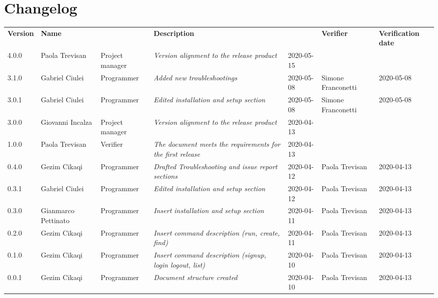 \section*{Changelog}
\renewcommand{\arraystretch}{1.8}
  \setlength\LTleft{-1.7cm}
  \begin{longtable}{|p{1.7cm}|p{2cm}|p{2.5cm}|p{3cm}|p{1.7cm}|p{2cm}|p{2.3cm}|}
    \hline
    \rowcolor{header}
    \textbf{Version} & \textbf{Name} & \centering{\textbf{Role}} & \textbf{Description} &      \centering{\textbf{Date}} & \textbf{Verifier} & \textbf{Verification date} \\
    4.0.0 & Paola Trevisan & Project manager & \small{\textit{Version alignment to the release product}} & 2020-05-15 & & \\
    
    3.1.0 & Gabriel Ciulei  & Programmer & \small{\textit{Added new troubleshootings}} & 2020-05-08 & Simone Franconetti & 2020-05-08 \\
    
    3.0.1 & Gabriel Ciulei  & Programmer & \small{\textit{Edited installation and setup section}} & 2020-05-08 & Simone Franconetti & 2020-05-08 \\
    
    3.0.0 & Giovanni Incalza & Project manager & \small{\textit{Version alignment to the release product}} & 2020-04-13 & & \\
    
    1.0.0 & Paola Trevisan & Verifier & \small{\textit{The document meets the requirements for the first release}} & 2020-04-13 & & \\
    
    0.4.0 & Gezim Cikaqi & Programmer & \small{\textit{Drafted Troubleshooting and issue report sections}} & 2020-04-12 & Paola Trevisan & 2020-04-13 \\
    
    0.3.1 & Gabriel Ciulei  & Programmer & \small{\textit{Edited installation and setup section}} & 2020-04-12 & Paola Trevisan & 2020-04-13 \\
    
    0.3.0 & Gianmarco Pettinato  & Programmer & \small{\textit{Insert installation and setup section}} & 2020-04-11 & Paola Trevisan & 2020-04-13 \\
    
    0.2.0 & Gezim Cikaqi  & Programmer & \small{\textit{Insert command description (run, create, find)}} & 2020-04-11 & Paola Trevisan & 2020-04-13 \\
    
	0.1.0 & Gezim Cikaqi  & Programmer & \small{\textit{Insert command description (signup, login logout, list)}} & 2020-04-10 & Paola Trevisan & 2020-04-13 \\
    
    0.0.1 & Gezim Cikaqi  & Programmer & \small{\textit{Document structure created}} & 2020-04-10 & Paola Trevisan & 2020-04-13\\

    \hline
  \end{longtable}
\setlength\LTleft{0cm}
\restoregeometry

